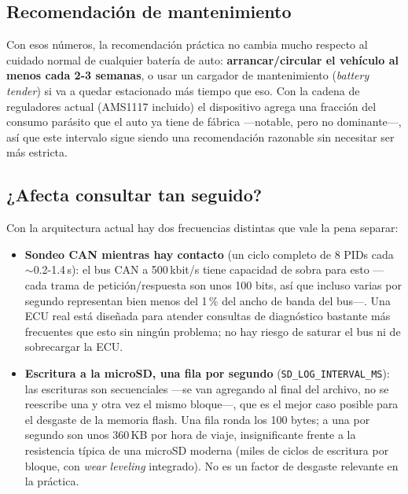 \subsection{Recomendación de mantenimiento}
Con esos números, la recomendación práctica no cambia mucho respecto al
cuidado normal de cualquier batería de auto: \textbf{arrancar/circular el
vehículo al menos cada 2-3 semanas}, o usar un cargador de mantenimiento
(\textit{battery tender}) si va a quedar estacionado más tiempo que eso.
Con la cadena de reguladores actual (AMS1117 incluido) el dispositivo
agrega una fracción del consumo parásito que el auto ya tiene de fábrica
—notable, pero no dominante—, así que este intervalo sigue siendo una
recomendación razonable sin necesitar ser más estricta.

\subsection{¿Afecta consultar tan seguido?}
Con la arquitectura actual hay dos frecuencias distintas que vale la pena
separar:

\begin{itemize}
  \item \textbf{Sondeo CAN mientras hay contacto} (un ciclo completo de 8
        PIDs cada $\sim$0.2-1.4\,s): el bus CAN a 500\,kbit/s tiene
        capacidad de sobra para esto —cada trama de petición/respuesta son
        unos 100 bits, así que incluso varias por segundo representan bien
        menos del 1\,\% del ancho de banda del bus—. Una ECU real está
        diseñada para atender consultas de diagnóstico bastante más
        frecuentes que esto sin ningún problema; no hay riesgo de saturar
        el bus ni de sobrecargar la ECU.
  \item \textbf{Escritura a la microSD, una fila por segundo}
        (\texttt{SD\_LOG\_INTERVAL\_MS}): las escrituras son secuenciales
        —se van agregando al final del archivo, no se reescribe una y otra
        vez el mismo bloque—, que es el mejor caso posible para el
        desgaste de la memoria flash. Una fila ronda los 100 bytes; a una
        por segundo son unos 360\,KB por hora de viaje, insignificante
        frente a la resistencia típica de una microSD moderna (miles de
        ciclos de escritura por bloque, con \textit{wear leveling}
        integrado). No es un factor de desgaste relevante en la práctica.
\end{itemize}

